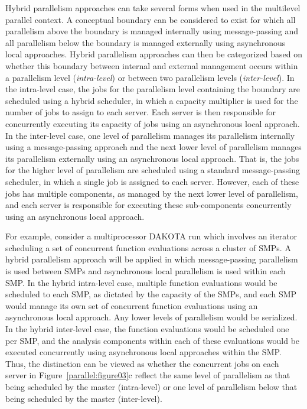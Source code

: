 Hybrid parallelism approaches can take several forms when used in the
multilevel parallel context. A conceptual boundary can be considered
to exist for which all parallelism above the boundary is managed
internally using message-passing and all parallelism below the
boundary is managed externally using asynchronous local approaches.
Hybrid parallelism approaches can then be categorized based on whether
this boundary between internal and external management occurs within a
parallelism level (\emph{intra-level}) or between two parallelism
levels (\emph{inter-level}). In the intra-level case, the jobs for the
parallelism level containing the boundary are scheduled using a hybrid
scheduler, in which a capacity multiplier is used for the number of
jobs to assign to each server. Each server is then responsible for
concurrently executing its capacity of jobs using an asynchronous
local approach. In the inter-level case, one level of parallelism
manages its parallelism internally using a message-passing approach
and the next lower level of parallelism manages its parallelism
externally using an asynchronous local approach. That is, the jobs for
the higher level of parallelism are scheduled using a standard
message-passing scheduler, in which a single job is assigned to each
server. However, each of these jobs has multiple components, as
managed by the next lower level of parallelism, and each server is
responsible for executing these sub-components concurrently using an
asynchronous local approach.

For example, consider a multiprocessor DAKOTA run which involves an
iterator scheduling a set of concurrent function evaluations across a
cluster of SMPs. A hybrid parallelism approach will be applied in
which message-passing parallelism is used between SMPs and
asynchronous local parallelism is used within each SMP. In the hybrid
intra-level case, multiple function evaluations would be scheduled to
each SMP, as dictated by the capacity of the SMPs, and each SMP would
manage its own set of concurrent function evaluations using an
asynchronous local approach. Any lower levels of parallelism would be
serialized. In the hybrid inter-level case, the function evaluations
would be scheduled one per SMP, and the analysis components within
each of these evaluations would be executed concurrently using
asynchronous local approaches within the SMP. Thus, the distinction
can be viewed as whether the concurrent jobs on each server in
Figure~\ref{parallel:figure03}c reflect the same level of parallelism
as that being scheduled by the master (intra-level) or one level of
parallelism below that being scheduled by the master (inter-level).


